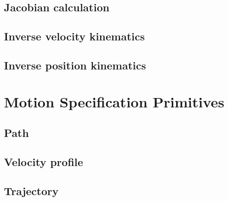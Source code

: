 \documentclass[a4paper,10pt]{report}
\begin{document}
\subsection{Jacobian calculation}
\label{sec:jacobian-calculation}

\subsection{Inverse velocity kinematics}
\label{sec:inverse-veloc-kinem}

\subsection{Inverse position kinematics}
\label{sec:inverse-posit-kinem}

\section{Motion Specification Primitives}
\label{sec:moti-spec-prim}

\subsection{Path}
\label{sec:path}

\subsection{Velocity profile}
\label{sec:velocity-profile}

\subsection{Trajectory}
\label{sec:trajectory}

\todos
\end{document}
